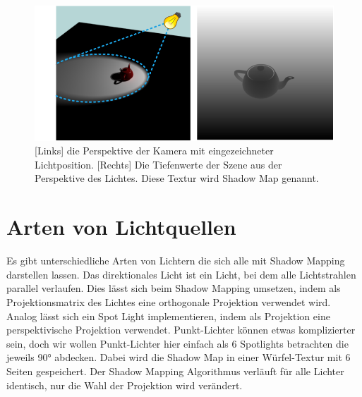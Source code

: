 \begin{figure}
	\begin{center}
		\includegraphics[width=1\textwidth]{res/img/shadow-mapping/shadow_map_principle.png}
    \caption{[Links] die Perspektive der Kamera mit eingezeichneter Lichtposition. 
    [Rechts] Die Tiefenwerte der Szene aus der Perspektive des Lichtes. 
    Diese Textur wird Shadow Map genannt.}
    \label{fig:shadow-map}
	\end{center}
\end{figure}
\section{Arten von Lichtquellen}
\label{section:types-of-sources}
Es gibt unterschiedliche Arten von Lichtern die sich alle mit Shadow Mapping darstellen lassen.
Das direktionales Licht ist ein Licht, bei dem alle Lichtstrahlen parallel verlaufen.
Dies lässt sich beim Shadow Mapping umsetzen, indem als Projektionsmatrix des Lichtes eine
orthogonale Projektion verwendet wird.
Analog lässt sich ein Spot Light implementieren, indem als Projektion eine perspektivische Projektion verwendet.
Punkt-Lichter können etwas komplizierter sein, doch wir wollen Punkt-Lichter hier einfach als 6 Spotlights betrachten
die jeweils 90° abdecken. Dabei wird die Shadow Map in einer Würfel-Textur mit 6 Seiten gespeichert.
Der Shadow Mapping Algorithmus verläuft für alle Lichter identisch, nur die Wahl der Projektion wird verändert.

